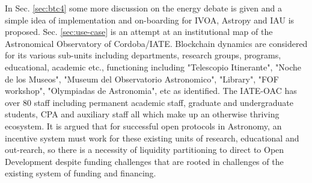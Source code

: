\documentclass[final,5p,times,twocolumn,authoryear]{elsarticle}
\begin{document}
In Sec. \ref{sec:btc4} some more discussion on the energy debate is given and a simple idea of implementation and on-boarding for IVOA, Astropy and IAU is proposed. Sec. \ref{sec:use-case} is an attempt at an institutional map of the Astronomical Observatory of Cordoba/IATE. Blockchain dynamics are considered for its various sub-units including departments, research groups, programs, educational, academic etc., functioning including "Telescopio Itinerante", "Noche de los Museos", "Museum del Observatorio Astronomico", "Library", "FOF workshop", "Olympiadas de Astronomia", etc as identified. The IATE-OAC has over 80 staff including permanent academic staff, graduate and undergraduate students,  CPA and auxiliary staff all which make up an otherwise thriving ecosystem. It is argued that for successful open protocols in Astronomy, an incentive system must work for these existing units of research, educational and out-rearch, so there is a necessity of liquidity partitioning to direct to Open Development despite funding challenges that are rooted in challenges of the existing system of funding and financing.

\end{document}
